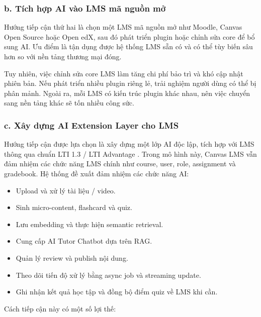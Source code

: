 \subsubsection*{b. Tích hợp AI vào LMS mã nguồn mở}

Hướng tiếp cận thứ hai là chọn một LMS mã nguồn mở như Moodle, Canvas Open
Source hoặc Open edX, sau đó phát triển plugin hoặc chỉnh sửa core để bổ sung
AI. Ưu điểm là tận dụng được hệ thống LMS sẵn có và có thể tùy biến sâu hơn so
với nền tảng thương mại đóng.

Tuy nhiên, việc chỉnh sửa core LMS làm tăng chi phí bảo trì và khó cập nhật
phiên bản. Nếu phát triển nhiều plugin riêng lẻ, trải nghiệm người dùng có thể
bị phân mảnh. Ngoài ra, mỗi LMS có kiến trúc plugin khác nhau, nên việc chuyển
sang nền tảng khác sẽ tốn nhiều công sức.

\subsubsection*{c. Xây dựng AI Extension Layer cho LMS}

Hướng tiếp cận được lựa chọn là xây dựng một lớp AI độc lập, tích hợp với LMS
thông qua chuẩn LTI 1.3 / LTI Advantage \cite{lti-advantage}. Trong mô
hình này, Canvas LMS vẫn đảm nhiệm các chức năng LMS chính như course, user,
role, assignment và gradebook. Hệ thống đề xuất đảm nhiệm các chức năng AI:

\begin{itemize}
    \item Upload và xử lý tài liệu / video.
    \item Sinh micro-content, flashcard và quiz.
    \item Lưu embedding và thực hiện semantic retrieval.
    \item Cung cấp AI Tutor Chatbot dựa trên RAG.
    \item Quản lý review và publish nội dung.
    \item Theo dõi tiến độ xử lý bằng async job và streaming update.
    \item Ghi nhận kết quả học tập và đồng bộ điểm quiz về LMS khi cần.
\end{itemize}

Cách tiếp cận này có một số lợi thế:

